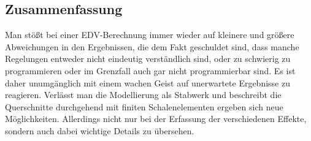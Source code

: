 {\textcolor{sectionTitleBlue}{\subsection{Zusammenfassung }}}

Man st\"{o}{\ss}t bei einer EDV-Berechnung immer wieder auf kleinere und gr\"{o}{\ss}ere Abweichungen in den Ergebnissen, die dem Fakt geschuldet sind, dass manche Regelungen entweder nicht eindeutig verst\"{a}ndlich sind, oder zu schwierig zu programmieren oder im Grenzfall auch gar nicht programmierbar sind. Es ist daher unumg\"{a}nglich mit einem wachen Geist auf unerwartete Ergebnisse zu reagieren.
Verl\"{a}sst man die Modellierung als Stabwerk und beschreibt die Querschnitte durchgehend mit finiten Schalenelementen ergeben sich neue M\"{o}glichkeiten. Allerdings nicht nur bei der Erfassung der verschiedenen Effekte, sondern auch dabei wichtige Details zu \"{u}bersehen.

